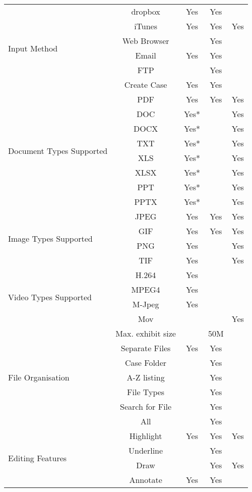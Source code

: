 \begin{center}
\begin{table}[htbp]
\begin{tabular}{|l| c|| c| c| c |}
\hline
\multirow{6}{*}{Input Method} & dropbox & Yes & Yes & \\
\cline{2-5}
& iTunes & Yes&Yes&Yes \\ 
\cline{2-5}
& Web Browser & &Yes& \\
\cline{2-5}
&Email&Yes&Yes&\\
\cline{2-5}
&FTP&&Yes&\\
\cline{2-5}
&Create Case&Yes&Yes&\\
\hline
\multirow{8}{*}{Document Types Supported} & PDF & Yes & Yes &Yes \\
\cline{2-5}
 &DOC&Yes*&&Yes\\
 \cline{2-5}
 &DOCX&Yes*&&Yes\\
 \cline{2-5}
 &TXT&Yes*&&Yes\\
 \cline{2-5}
 &XLS&Yes*&&Yes\\
 \cline{2-5}
 &XLSX&Yes*&&Yes\\
 \cline{2-5}
 &PPT&Yes*&&Yes\\
 \cline{2-5}
 &PPTX&Yes*&&Yes\\
\hline
\multirow{4}{*}{Image Types Supported} & JPEG & Yes & Yes &Yes \\
\cline{2-5}
 &GIF & Yes & Yes &Yes \\
 \cline{2-5}
 &PNG & Yes &  &Yes \\
 \cline{2-5}
 &TIF & Yes &  &Yes \\
\hline
\multirow{4}{*}{Video Types Supported} & H.264 & Yes&& \\
\cline{2-5}
 &MPEG4&Yes&&\\
 \cline{2-5}
 &M-Jpeg&Yes&&\\
 \cline{2-5}
 &Mov&&&Yes\\
\hline
\multirow{7}{*}{File Organisation} & Max. exhibit size & &50M& \\
\cline{2-5}
&Separate Files&Yes&Yes&\\
\cline{2-5}
&Case Folder&&Yes&\\
\cline{2-5}
&A-Z listing&&Yes&\\
\cline{2-5}
&File Types&&Yes&\\
\cline{2-5}
&Search for File&&Yes&\\
\cline{2-5}
&All&&Yes&\\
\hline
\multirow{9}{*}{Editing Features} & Highlight  &Yes &Yes&Yes \\
\cline{2-5}
 & Underline&&Yes&\\
 \cline{2-5}
 &Draw&&Yes&Yes\\
 \cline{2-5}
 &Annotate&Yes&Yes&\\

\end{tabular}
\end{table}
\end{center}
